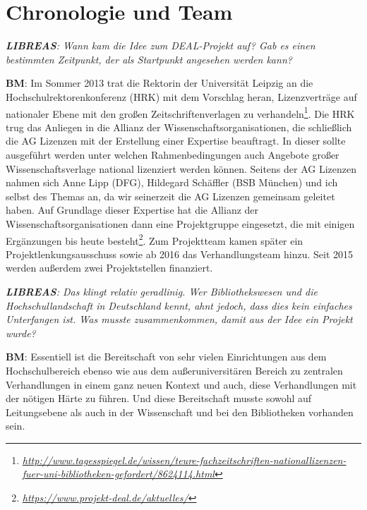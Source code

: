 \documentclass[a4paper,
fontsize=11pt,
oneside,
numbers=noperiodatend,
parskip=half-,
bibliography=totoc,
final
]{scrartcl}
\begin{document}
\section{Chronologie und Team}\label{chronologie-und-team}

\emph{\textbf{LIBREAS}: Wann kam die Idee zum DEAL-Projekt auf? Gab es
einen bestimmten Zeitpunkt, der als Startpunkt angesehen werden kann?}

\textbf{BM}: Im Sommer 2013 trat die Rektorin der Universität Leipzig an
die Hochschulrektorenkonferenz (HRK) mit dem Vorschlag heran,
Lizenzverträge auf nationaler Ebene mit den großen Zeitschriftenverlagen
zu verhandeln\footnote{\href{http://www.tagesspiegel.de/wissen/teure-fachzeitschriften-nationallizenzen-fuer-uni-bibliotheken-gefordert/8624114.html}{\emph{http://www.tagesspiegel.de/wissen/teure-fachzeitschriften-nationallizenzen-fuer-uni-bibliotheken-gefordert/8624114.html}}}.
Die HRK trug das Anliegen in die Allianz der
Wissenschaftsorganisationen, die schließlich die AG Lizenzen mit der
Erstellung einer Expertise beauftragt. In dieser sollte ausgeführt
werden unter welchen Rahmenbedingungen auch Angebote großer
Wissenschaftsverlage national lizenziert werden können. Seitens der AG
Lizenzen nahmen sich Anne Lipp (DFG), Hildegard Schäffler (BSB München)
und ich selbst des Themas an, da wir seinerzeit die AG Lizenzen
gemeinsam geleitet haben. Auf Grundlage dieser Expertise hat die Allianz
der Wissenschaftsorganisationen dann eine Projektgruppe eingesetzt, die
mit einigen Ergänzungen bis heute besteht\footnote{\href{https://www.projekt-deal.de/aktuelles/}{\emph{https://www.projekt-deal.de/aktuelles/}}}.
Zum Projektteam kamen später ein Projektlenkungsausschuss sowie ab 2016
das Verhandlungsteam hinzu. Seit 2015 werden außerdem zwei
Projektstellen finanziert.

\emph{\textbf{LIBREAS}: Das klingt relativ geradlinig. Wer
Bibliothekswesen und die Hochschullandschaft in Deutschland kennt, ahnt
jedoch, dass dies kein einfaches Unterfangen ist. Was musste
zusammenkommen, damit aus der Idee ein Projekt wurde?}

\textbf{BM}: Essentiell ist die Bereitschaft von sehr vielen
Einrichtungen aus dem Hochschulbereich ebenso wie aus dem
außeruniversitären Bereich zu zentralen Verhandlungen in einem ganz
neuen Kontext und auch, diese Verhandlungen mit der nötigen Härte zu
führen. Und diese Bereitschaft musste sowohl auf Leitungsebene als auch
in der Wissenschaft und bei den Bibliotheken vorhanden sein.

\pagebreak
\end{document}
